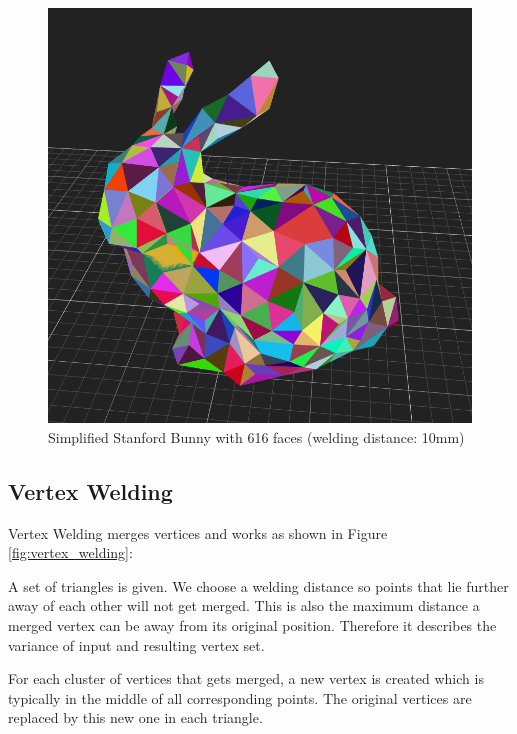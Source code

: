 \documentclass[../ClassicThesis.tex]{subfiles}
\begin{document}
\begin{figure}
\includegraphics[width=0.8\columnwidth]{Images/04-approx-welding-rabbit-10mm.png}
\caption{Simplified Stanford Bunny with 616 faces (welding distance: 10mm)}
\label{fig:10mmBunny}
\end{figure}




\subsection{Vertex Welding}
\label{sec:vertex_welding}










Vertex Welding merges vertices and works as shown in Figure \ref{fig:vertex_welding}:

A set of triangles is given. We choose a welding distance so points that lie further away of each other will not get merged. This is also the maximum distance a merged vertex can be away from its original position. Therefore it describes the variance of input and resulting vertex set.

For each cluster of vertices that gets merged, a new vertex is created which is typically in the middle of all corresponding points. The original vertices are replaced by this new one in each triangle.
\end{document}
